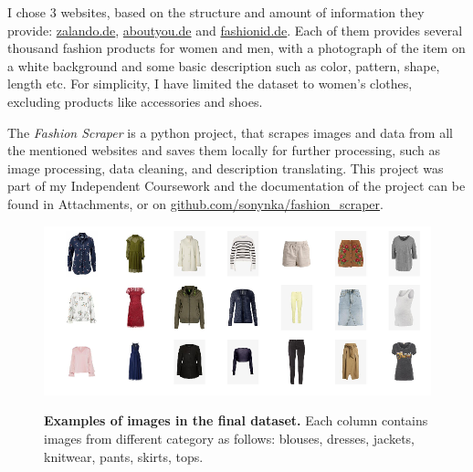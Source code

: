 \documentclass{article}
\begin{document}
I chose 3 websites, based on the structure and amount of information they provide: \href{https://www.zalando.de/damen-home/}{zalando.de}, \href{https://www.aboutyou.de/}{aboutyou.de} and \href{https://www.fashionid.de/damen/}{fashionid.de}. Each of them provides several thousand fashion products for women and men, with a photograph of the item on a white background and some basic description such as color, pattern, shape, length etc. For simplicity, I have limited the dataset to women's clothes, excluding products like accessories and shoes.

The \textit{Fashion Scraper} is a python project, that scrapes images and data from all the mentioned websites and saves them locally for further processing, such as image processing, data cleaning, and description translating. This project was part of my Independent Coursework and the documentation of the project can be found in Attachments, or on \href{https://github.com/sonynka/fashion_scraper}{github.com/sonynka/fashion\_scraper}.

\begin{figure}[h]
\centering
{\includegraphics[width=\linewidth]{dataset_examples/img_grid2}}
\caption{\label{fig:dataset} \textbf{Examples of images in the final dataset.} Each column contains images from different category as follows: blouses, dresses, jackets, knitwear, pants, skirts, tops.}
\end{figure}
\end{document}
